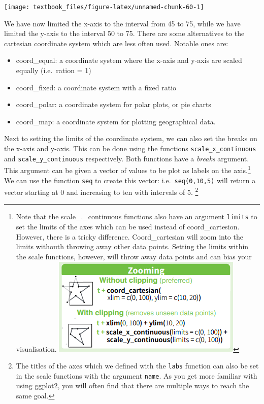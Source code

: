 \documentclass[]{tufte-book}
\providecommand{\tightlist}{%
  \setlength{\itemsep}{0pt}\setlength{\parskip}{0pt}}
\begin{document}
\texttt{[image: textbook\_files/figure-latex/unnamed-chunk-60-1]}

We have now limited the x-axis to the interval from 45 to 75, while we have limited the y-axis to the interval 50 to 75. There are some alternatives to the cartesian coordinate system which are less often used. Notable ones are:

\begin{itemize}
\tightlist
\item
  coord\_equal: a coordinate system where the x-axis and y-axis are scaled equally (i.e.~ration = 1)
\item
  coord\_fixed: a coordinate system with a fixed ratio
\item
  coord\_polar: a coordinate system for polar plots, or pie charts
\item
  coord\_map: a coordinate system for plotting geographical data.
\end{itemize}

Next to setting the limits of the coordinate system, we can also set the breaks on the x-axis and y-axis. This can be done using the functions \texttt{scale\_x\_continuous} and \texttt{scale\_y\_continuous} respectively. Both functions have a \emph{breaks} argument. This argument can be given a vector of values to be plot as labels on the axis.\footnote{Note that the scale\_.\_continuous functions also have an argument \texttt{limits} to set the limits of the axes which can be used instead of coord\_cartesion. However, there is a tricky difference. Coord\_cartesian will zoom into the limits withouth throwing away other data points. Setting the limits within the scale functions, however, will throw away data points and can bias your visualisation. \includegraphics{images/zoom.png}} We can use the function \texttt{seq} to create this vector: i.e.~\texttt{seq(0,10,5)} will return a vector starting at 0 and increasing to ten with intervals of 5. \footnote{The titles of the axes which we defined with the \texttt{labs} function can also be set in the scale functions with the argument \texttt{name}. As you get more familiar with using ggplot2, you will often find that there are multiple ways to reach the same goal.}
\end{document}
